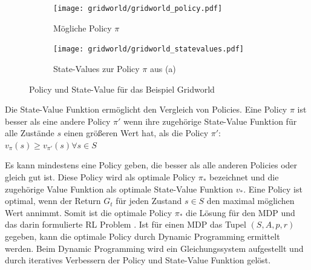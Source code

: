 \begin{figure}
    \centering
    \begin{subfigure}[b]{0.45\textwidth}
      \centering
      \texttt{[image: gridworld/gridworld\_policy.pdf]}
      \caption{Mögliche Policy $\pi$}
      \label{fig:gridworld_policy}
    \end{subfigure}
    \begin{subfigure}[b]{0.45\textwidth}
      \centering
      \texttt{[image: gridworld/gridworld\_statevalues.pdf]}
      \caption{State-Values zur Policy $\pi$ aus (a)}
      \label{fig:gridworld_statevalues}
    \end{subfigure}
    \caption[Policy und State-Value für das Beispiel Gridworld]{Policy und State-Value für das Beispiel Gridworld\protect\footnotemark}
    \label{fig:gridworld_policy_statevalue}
    
\end{figure}

Die State-Value Funktion ermöglicht den Vergleich von Policies.
Eine Policy $\pi$ ist besser als eine andere Policy $\pi'$ wenn ihre zugehörige State-Value Funktion für alle Zustände $s$ einen größeren Wert hat, als die Policy $\pi'$: $v_\pi(s) \ge v_{\pi'}(s) \forall s \in S$

Es kann mindestens eine Policy geben, die besser als alle anderen Policies oder gleich gut ist.
Diese Policy wird als optimale Policy $\pi_*$ bezeichnet und die zugehörige Value Funktion als optimale State-Value Funktion $v_*$. \cite[S. 61 ff.]{suttonReinforcementLearningIntroduction2018}
Eine Policy ist optimal, wenn der Return $G_t$ für jeden Zustand $s \in S$ den maximal möglichen Wert annimmt.
Somit ist die optimale Policy $\pi_*$ die Lösung für den \ac{MDP} und das darin formulierte \ac{RL} Problem \cite[S. 62 ff.]{suttonReinforcementLearningIntroduction2018}.
Ist für einen \ac{MDP} das Tupel $(S,A,p,r)$ gegeben, kann die optimale Policy durch Dynamic Programming ermittelt werden. Beim Dynamic Programming wird ein Gleichungssystem aufgestellt und durch iteratives Verbessern der Policy und State-Value Funktion gelöst.\cite[S. 73ff.]{suttonReinforcementLearningIntroduction2018} 